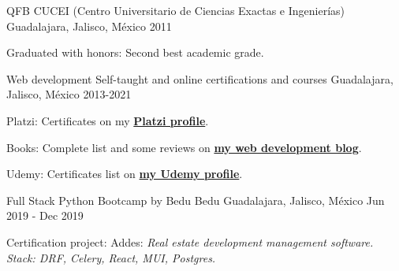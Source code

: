 

\begin{cventries}
  \cventry
    {QFB}
    {CUCEI (Centro Universitario de Ciencias Exactas e Ingenierías)}
    {Guadalajara, Jalisco, México}
    {2011}
    {
      \begin{cvitems}
        \item {Graduated with honors: Second best academic grade.}
      \end{cvitems}
    }

    \cventry
    {Web development}
    {Self-taught and online certifications and courses}
    {Guadalajara, Jalisco, México}
    {2013-2021}
    {
      \begin{cvitems}
        \item {Platzi: Certificates on my \color{gray} \textbf{\href{https://platzi.com/@eduardo-zepeda/}{Platzi profile}}.}
        \item {Books: Complete list and some reviews on \color{gray} \textbf{ \href{https://coffeebytes.dev/pages/libros-que-he-leido-y-resenas/}{my web development blog}}.}
        \item {Udemy: Certificates list on \color{gray} \textbf{\href{https://www.udemy.com/user/carlos-eduardo-magallon-zepeda/}{my Udemy profile}}.}
      \end{cvitems}
    }

    \cventry
    {Full Stack Python Bootcamp by Bedu}
    {Bedu}
    {Guadalajara, Jalisco, México}
    {Jun 2019 - Dec 2019}
    {
      \begin{cvitems}
        \item {Certification project: Addes: \textit{Real estate development management software. Stack: DRF, Celery, React, MUI, Postgres.}}
      \end{cvitems}
    }
\end{cventries}
